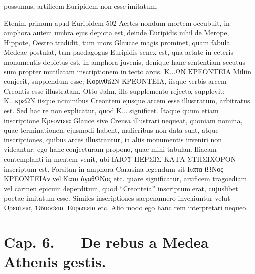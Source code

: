 \documentclass[landscape, a4paper, 11pt, oneside, polutonikogreek, german]{article}
\begin{document}
possumus, artificem Euripidem non esse imitatum.

Etenim primum apud Euripidem 502 Aeetes nondum mortem occubuit, in amphora autem umbra ejus depicta est, deinde Euripidis nihil de Merope, Hippote, Oestro tradidit, tum mors Glaucae magis prominet, quam fabula Medeae postulat, tum paedagogus Euripidis senex est, qua aetate in ceteris monumentis depictus est, in amphora juvenis, denique hanc sententiam secutus sum propter mutilatam inscriptionem in tecto arcis. Κ...ΩΝ ΚΡΕΟΝΤΕΙΑ Miliin conjecit, supplendum esse; ΚορινθιΩΝ ΚΡΕΟΝΤΕΙΑ, iisque verbis arcem Creontis esse illustratam. Otto Jahn, illo supplemento rejecto, supplevit: Κ...κρεΩΝ iisque nominibus Creontem ejusque arcem esse illustratum, arbitratus est. Sed hac re non explicatur, quod Κ... significet. Itaque quum etiam inscriptione Κρεοντεια Glauce sive Creusa illustrari nequeat, quoniam nomina, quae terminationem ejusmodi habent, mulieribus non data sunt, atque inscriptiones, quibus arces illustrantur, in aliis monumentis inveniri non videantur: ego hanc conjecturam propono, quae mihi tabulam Iliacam contemplanti in mentem venit, ubi ΙΛΙΟΥ ΠΕΡΣΙΣ ΚΑΤΑ ΣΤΗΣΙΧΟΡΟΝ inscriptum est. Forsitan in amphora Canusina legendum sit Κατα ἰΩΝος ΚΡΕΟΝΤΕΙΑν vel Κατα ἀγαθΩΝος etc. quare significatur, artificem tragoediam vel carmen epicum deperditum, quod "`Creonteia"' inscriptum erat, cujuslibet poetae imitatum esse. Similes inscriptiones saepenumero inveniuntur velut Ὀρεστεία, Ὀδύσσεια, Εὐρωπεία etc. Alio modo ego hanc rem interpretari nequeo.
\clearpage
\section{Cap. 6. --- De rebus a Medea Athenis gestis.}
\end{document}
